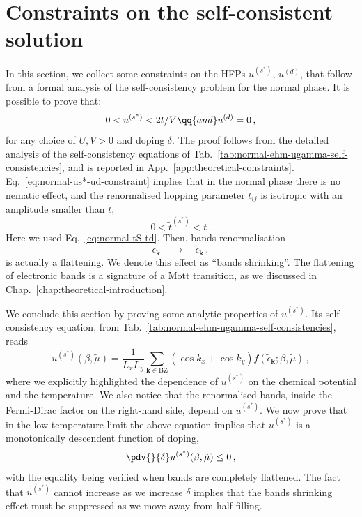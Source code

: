 \section{Constraints on the self-consistent solution} \label{sec:normal-sceq-analysis}

In this section, we collect some constraints on the HFPs $u^{(s^*)}$, $u^{(d)}$, that follow from a formal analysis of the self-consistency problem for the normal phase. It is possible to prove that:
\begin{equation}\label{eq:normal-us*-ud-constraint}
	0 < u^{(s^*)} < 2t/V
	\qq{and}
	u^{(d)} = 0 \, ,
\end{equation}
for any choice of $U,V>0$ and doping $\delta$. The proof follows from the detailed analysis of the self-consistency equations of Tab.~\ref{tab:normal-ehm-ugamma-self-consistencies}, and is reported in App.~\ref{app:theoretical-constraints}. Eq.~\eqref{eq:normal-us*-ud-constraint} implies that in the normal phase there is no nematic effect, and the renormalised hopping parameter $\tilde{t}_{ij}$ is isotropic with an amplitude smaller than $t$,
\[
	0 < \tilde{t}^{(s^*)} < t \, .
\]
Here we used Eq.~\eqref{eq:normal-tS-td}. Then, bands renormalisation
\[
	\epsilon_\mathbf{k}
	\quad\to\quad
	\tilde{\epsilon}_\mathbf{k} \, ,
\]
is actually a flattening. We denote this effect as ``bands shrinking''. The flattening of electronic bands is a signature of a Mott transition, as we discussed in Chap.~\ref{chap:theoretical-introduction}.

We conclude this section by proving some analytic properties of $u^{(s^*)}$. Its self-consistency equation, from Tab.~\ref{tab:normal-ehm-ugamma-self-consistencies}, reads
\begin{equation}\label{eq:normal-us*(beta,mu)}
	u^{(s^*)}(\beta,\tilde{\mu}) = \frac{1}{L_x L_y} \sum_{\mathbf{k}\in\mathrm{BZ}} (\cos k_x + \cos k_y) f(\tilde{\epsilon}_\mathbf{k};\beta,\tilde{\mu}) \, ,
\end{equation}
where we explicitly highlighted the dependence of $u^{(s^*)}$ on the chemical potential and the temperature. We also notice that the renormalised bands, inside the Fermi-Dirac factor on the right-hand side, depend on $u^{(s^*)}$. We now prove that in the low-temperature limit the above equation implies that $u^{(s^*)}$ is a monotonically descendent function of doping,
\begin{equation}\label{eq:normal-pdv-uS}
	\pdv{}{\delta} u^{(s^*)}(\beta,\tilde{\mu}) \le 0 \, ,
\end{equation}
with the equality being verified when bands are completely flattened. The fact that $u^{(s^*)}$ cannot increase as we increase $\delta$ implies that the bands shrinking effect must be suppressed as we move away from half-filling.

